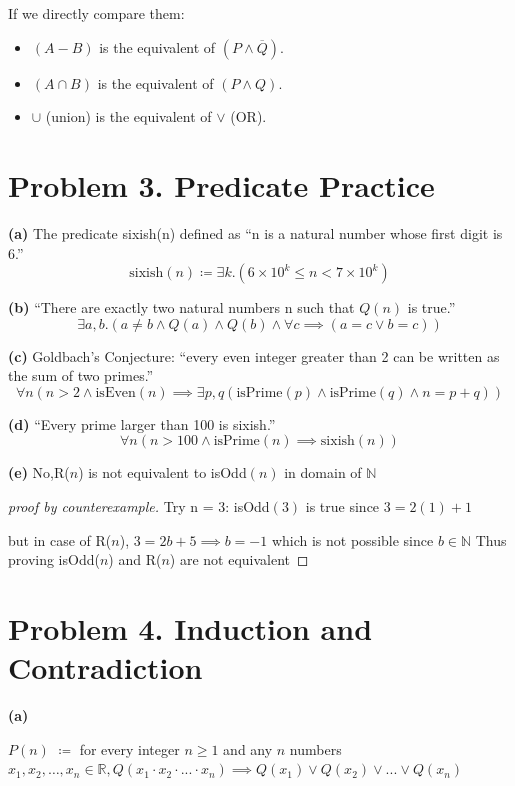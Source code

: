 \documentclass{article}
\begin{document}
If we directly compare them:
\begin{itemize}
    \item $(A - B)$ is the equivalent of $(P \land \overline{Q})$.
    \item $(A \cap B)$ is the equivalent of $(P \land Q)$.
    \item $\cup$ (union) is the equivalent of $\lor$ (OR).
\end{itemize}

\pagebreak

\section*{Problem 3. Predicate Practice}


\textbf{(a)} The predicate sixish(n) defined as “n is a natural number whose first digit is 6.”
$$\text{sixish}(n) \coloneqq \exists k.(6 \times 10^k \leq n < 7 \times 10^k)$$

\noindent\textbf{(b)} “There are exactly two natural numbers n such that $Q(n)$ is true.”
$$ \exists a,b.(a \neq b \land Q(a) \land Q(b) \land \forall c \implies (a = c \lor b = c)) $$

\noindent\textbf{(c)} Goldbach’s Conjecture: “every even integer greater than 2 can be written as the
sum of two primes.”
$$ \forall n( n > 2 \land \text{isEven}(n) \implies \exists p,q (\text{isPrime}(p) \land \text{isPrime}(q) \land n = p + q))$$

\noindent\textbf{(d)}  “Every prime larger than 100 is sixish.”
$$ \forall n (n > 100 \land \text{isPrime}(n) \implies \text{sixish}(n))$$

\noindent\textbf{(e)} No,R($n$) is not equivalent to isOdd$(n)$ in domain of $\mathbb{N}$  
\begin{proof}[proof by counterexample] Try n = 3:
isOdd$(3)$ is true since $3 = 2(1) + 1$

but in case of R($n$), $3 = 2b + 5 \implies b = -1$ which is not possible since $b \in \mathbb{N}$
Thus proving isOdd($n$) and R($n$) are not equivalent
\end{proof}

\section*{Problem 4. Induction and Contradiction}

\textbf{(a)}

$P(n)$ $\coloneqq$ for every integer $ n \geq 1 $ and any $n$ numbers $x_1,x_2,\dots,x_n \in \mathbb{R}, Q(x_1 \cdot x_2 \cdot ... \cdot x_n)
 \implies Q(x_1) \lor Q(x_2) \lor ...  \lor Q(x_n)$ 
\end{document}
